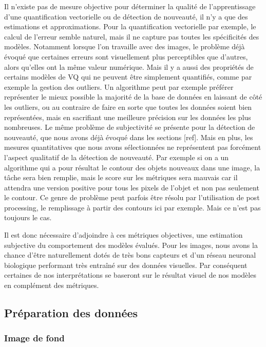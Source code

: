 	Il n'existe pas de mesure objective pour déterminer la qualité de l'apprentissage d'une quantification vectorielle ou de détection de nouveauté, il n'y a que des estimations et approximations. Pour la quantification vectorielle par exemple, le calcul de l'erreur semble naturel, mais il ne capture pas toutes les spécificités des modèles. Notamment lorsque l'on travaille avec des images, le problème déjà évoqué que certaines erreurs sont visuellement plus perceptibles que d'autres, alors qu'elles ont la même valeur numérique. Mais il y a aussi des propriétés de certains modèles de VQ qui ne peuvent être simplement quantifiés, comme par exemple la gestion des outliers. Un algorithme peut par exemple préférer représenter le mieux possible la majorité de la base de données en laissant de côté les outliers, ou au contraire de faire en sorte que toutes les données soient bien représentées, mais en sacrifiant une meilleure précision sur les données les plus nombreuses. Le même problème de subjectivité se présente pour la détection de nouveauté, que nous avons déjà évoqué dans les sections [ref]. Mais en plus, les mesures quantitatives que nous avons sélectionnées ne représentent pas forcément l'aspect qualitatif de la détection de nouveauté. Par exemple si on a un algorithme qui a pour résultat le contour des objets nouveaux dans une image, la tâche sera bien remplie, mais le score sur les métriques sera mauvais car il attendra une version positive pour tous les pixels de l'objet et non pas seulement le contour. Ce genre de problème peut parfois être résolu par l'utilisation de post processing, le remplissage à partir des contours ici par exemple. Mais ce n'est pas toujours le cas.

	Il est donc nécessaire d'adjoindre à ces métriques objectives, une estimation subjective du comportement des modèles évalués. Pour les images, nous avons la chance d'être naturellement dotés de très bons capteurs et d'un réseau neuronal biologique performant très entraîné sur des données visuelles. Par conséquent certaines de nos interprétations se baseront sur le résultat visuel de nos modèles en complément des métriques.

	\subsection{Préparation des données}

	\subsubsection{Image de fond}

